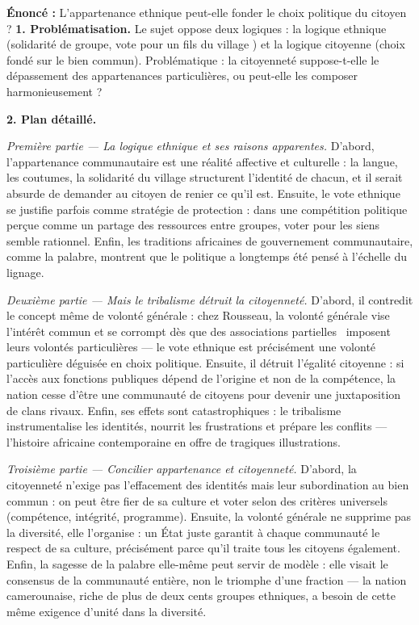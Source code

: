 \documentclass[11pt]{article}
\begin{document}
\begin{exoresolu}
\textbf{Énoncé :} L'appartenance ethnique peut-elle fonder le choix politique du citoyen ?
\tcblower
\textbf{1. Problématisation.} Le sujet oppose deux logiques : la logique ethnique (solidarité de groupe, vote pour \guillemotleft un fils du village \guillemotright) et la logique citoyenne (choix fondé sur le bien commun). Problématique : la citoyenneté suppose-t-elle le dépassement des appartenances particulières, ou peut-elle les composer harmonieusement ?

\textbf{2. Plan détaillé.}

\emph{Première partie — La logique ethnique et ses raisons apparentes.} D'abord, l'appartenance communautaire est une réalité affective et culturelle : la langue, les coutumes, la solidarité du village structurent l'identité de chacun, et il serait absurde de demander au citoyen de renier ce qu'il est. Ensuite, le vote ethnique se justifie parfois comme stratégie de protection : dans une compétition politique perçue comme un partage des ressources entre groupes, voter pour les siens semble rationnel. Enfin, les traditions africaines de gouvernement communautaire, comme la palabre, montrent que le politique a longtemps été pensé à l'échelle du lignage.

\emph{Deuxième partie — Mais le tribalisme détruit la citoyenneté.} D'abord, il contredit le concept même de volonté générale : chez Rousseau, la volonté générale vise l'intérêt commun et se corrompt dès que des \guillemotleft associations partielles \guillemotright\ imposent leurs volontés particulières — le vote ethnique est précisément une volonté particulière déguisée en choix politique. Ensuite, il détruit l'égalité citoyenne : si l'accès aux fonctions publiques dépend de l'origine et non de la compétence, la nation cesse d'être une communauté de citoyens pour devenir une juxtaposition de clans rivaux. Enfin, ses effets sont catastrophiques : le tribalisme instrumentalise les identités, nourrit les frustrations et prépare les conflits — l'histoire africaine contemporaine en offre de tragiques illustrations.

\emph{Troisième partie — Concilier appartenance et citoyenneté.} D'abord, la citoyenneté n'exige pas l'effacement des identités mais leur subordination au bien commun : on peut être fier de sa culture et voter selon des critères universels (compétence, intégrité, programme). Ensuite, la volonté générale ne supprime pas la diversité, elle l'organise : un État juste garantit à chaque communauté le respect de sa culture, précisément parce qu'il traite tous les citoyens également. Enfin, la sagesse de la palabre elle-même peut servir de modèle : elle visait le consensus de la communauté entière, non le triomphe d'une fraction — la nation camerounaise, riche de plus de deux cents groupes ethniques, a besoin de cette même exigence d'unité dans la diversité.


\end{exoresolu}
\end{document}
